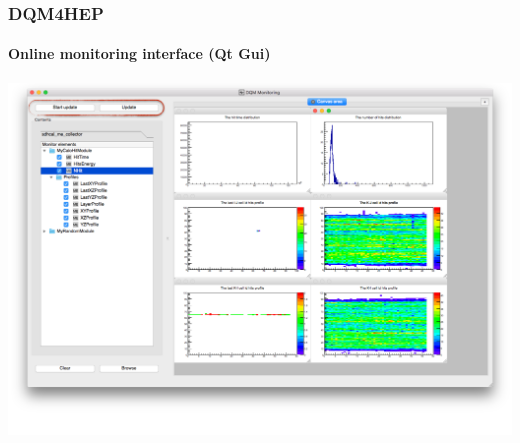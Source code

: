 \documentclass[presentation, 10pt]{beamer}
\begin{document}
\begin{frame}
  \frametitle{DQM4HEP}
  \framesubtitle{Online monitoring interface (Qt Gui)}
    \centering\includegraphics[width=0.95\linewidth]{figs/DQM4HEPMonitoringGui.png}
\end{frame}
\end{document}
